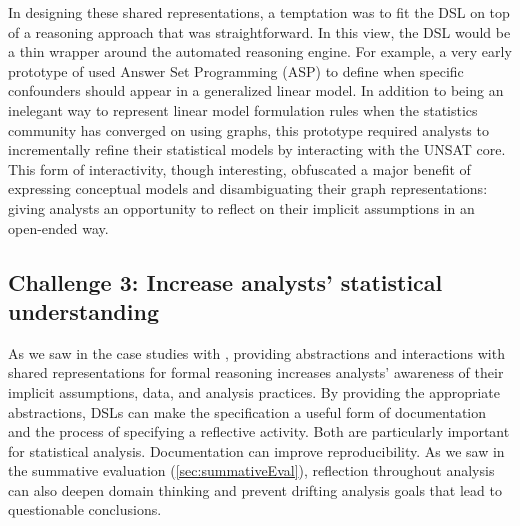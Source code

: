 In designing these shared representations, a temptation was to fit the DSL on
top of a reasoning approach that was straightforward. In this view, the DSL
would be a thin wrapper around the automated reasoning engine. For example, a
very early prototype of \tisane used Answer Set Programming (ASP) to define when
specific confounders should appear in a generalized linear model. In addition to
being an inelegant way to represent linear model formulation rules when the
statistics community has converged on using graphs, this prototype required
analysts to incrementally refine their statistical models by interacting with
the UNSAT core. This form of interactivity, though interesting, obfuscated a
major benefit of expressing conceptual models and disambiguating their graph
representations: giving analysts an opportunity to reflect on their implicit
assumptions in an open-ended way.

\subsection{Challenge 3: Increase analysts' statistical understanding}
As we saw in the case studies with \tisane, providing abstractions and
interactions with shared representations for formal reasoning increases
analysts' awareness of their implicit assumptions, data, and analysis practices.
By providing the appropriate abstractions, DSLs can make the specification a
useful form of documentation and the process of specifying a reflective
activity. Both are particularly important for statistical analysis.
Documentation can improve reproducibility. As we saw in the summative
evaluation (\autoref{sec:summativeEval}), reflection throughout analysis can also deepen domain thinking and
prevent drifting analysis goals that lead to questionable conclusions. 

\begin{comment}
\section{Recent developments} \label{sec:recentDevelopments}
Mention: in LLMs impact the contributions of this dissertation, exciting opportunities to leverage them to realize the goals of this work

\subsection{What about in the face of LLMs?}

But how do people express their domain knowledge, make the process meaningful

Mention LLMs as a technology to use here?
\end{comment}

